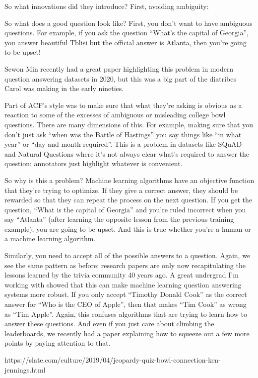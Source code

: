 So what innovations did they introduce?  First, avoiding ambiguity: 

So what does a good question look like?  First, you don’t want to have ambiguous questions.  For example, if you ask the question “What’s the capital of Georgia”, you answer beautiful Tblisi but the official answer is Atlanta, then you’re going to be upset! 

Sewon Min recently had a great paper highlighting this problem in modern question answering datasets in 2020, but this was a big part of the diatribes Carol was making in the early nineties.

Part of ACF's style was to make sure that what they’re asking is obvious as a reaction to some of the excesses of ambiguous or misleading college bowl questions.  There are many dimensions of this.  For example, making sure that you don’t just ask “when was the Battle of Hastings” you say things like “in what year” or “day and month required”.  This is a problem in datasets like SQuAD and Natural Questions where it’s not always clear what’s required to answer the question: annotators just highlight whatever is convenient.

So why is this a problem?  Machine learning algorithms have an objective function that they’re trying to optimize.  If they give a correct answer, they should be rewarded so that they can repeat the process on the next question.  If you get the question, “What is the capital of Georgia” and you’re ruled incorrect when you say “Atlanta” (after learning the opposite lesson from the previous training example), you are going to be upset.  And this is true whether you’re a human or a machine learning algorithm.

Similarly, you need to accept all of the possible answers to a question.  Again, we see the same pattern as before: research papers are only now recapitulating the lessons learned by the trivia community 40 years ago.  A great undergrad I’m working with showed that this can make machine learning question answering systems more robust.  If you only accept “Timothy Donald Cook” as the correct answer for “Who is the CEO of Apple”, then that makes “Tim Cook” as wrong as “Tim Apple”.  Again, this confuses algorithms that are trying to learn how to answer these questions.  And even if you just care about climbing the leaderboards, we recently had a paper explaining how to squeeze out a few more points by paying attention to that.

https://slate.com/culture/2019/04/jeopardy-quiz-bowl-connection-ken-jennings.html

